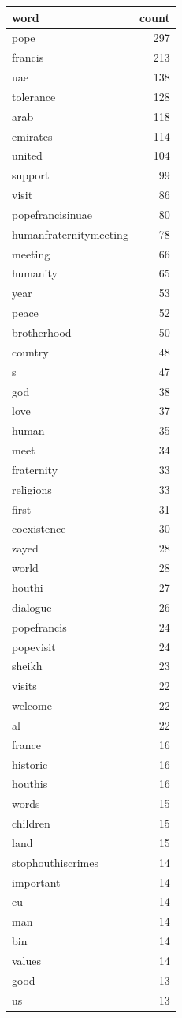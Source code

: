 \begin{tabular}{lr}
\toprule
word & count \\
\midrule
pope & 297 \\
francis & 213 \\
uae & 138 \\
tolerance & 128 \\
arab & 118 \\
emirates & 114 \\
united & 104 \\
support & 99 \\
visit & 86 \\
popefrancisinuae & 80 \\
humanfraternitymeeting & 78 \\
meeting & 66 \\
humanity & 65 \\
year & 53 \\
peace & 52 \\
brotherhood & 50 \\
country & 48 \\
s & 47 \\
god & 38 \\
love & 37 \\
human & 35 \\
meet & 34 \\
fraternity & 33 \\
religions & 33 \\
first & 31 \\
coexistence & 30 \\
zayed & 28 \\
world & 28 \\
houthi & 27 \\
dialogue & 26 \\
popefrancis & 24 \\
popevisit & 24 \\
sheikh & 23 \\
visits & 22 \\
welcome & 22 \\
al & 22 \\
france & 16 \\
historic & 16 \\
houthis & 16 \\
words & 15 \\
children & 15 \\
land & 15 \\
stophouthiscrimes & 14 \\
important & 14 \\
eu & 14 \\
man & 14 \\
bin & 14 \\
values & 14 \\
good & 13 \\
us & 13 \\
\bottomrule
\end{tabular}
